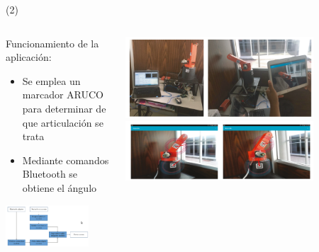 \begin{frame}{\citetitle{\EntradaBibtex} (2)}
\begin{columns}
\begin{column}{0.5\textwidth}
Funcionamiento de la aplicación:
		\begin{itemize}
		\item Se emplea un marcador ARUCO para determinar de que articulación se trata
		\item Mediante comandos Bluetooth se obtiene el ángulo
		\end{itemize}
\begin{center}
     \includegraphics[width=0.79\textwidth]{Figs/SistemaAR_Maestria2}
     \end{center}
\end{column}
\begin{column}{0.5\textwidth}  
    \begin{center}
     \includegraphics[width=0.79\textwidth]{Figs/SistemaAR_Maestria3}
     \includegraphics[width=0.79\textwidth]{Figs/SistemaAR_Maestria4}
     \end{center}
\end{column}
\end{columns}
\end{frame}


